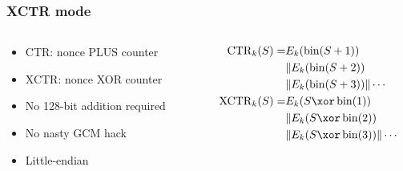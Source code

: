 \documentclass[aspectratio=169]{beamer}
\begin{document}
\begin{frame}
    \frametitle{XCTR mode}
    \begin{columns}
        \begin{column}{.4\textwidth}
            \begin{itemize}
                \item CTR: nonce PLUS counter
                \item XCTR: nonce XOR counter
                \item No 128-bit addition required
                \item No nasty GCM hack
                \item Little-endian
            \end{itemize}
        \end{column}
        \begin{column}{.6\textwidth}
            \begin{align*}
                \operatorname{CTR}_k(S) =& E_k(\fromint(S + 1)) \\
                & \Concat  E_k(\fromint(S + 2)) \\ 
                & \Concat  E_k(\fromint(S + 3)) \Concat \cdots \\
                \XCTR_k(S) =& E_k(S \xor \fromint(1)) \\
                & \Concat  E_k(S \xor \fromint(2)) \\ 
                & \Concat  E_k(S \xor \fromint(3)) \Concat \cdots \\
            \end{align*}
        \end{column}
    \end{columns}
\end{frame}
\end{document}
